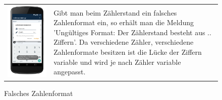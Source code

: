 \begin{figure}[h]
\begin{tabularx}{\textwidth}{X  X}
	\includegraphics[scale = 0.155]{img/AndroidMockup/illegalFormatException} \caption{Falsches Zahlenformat} & Gibt man beim Zählerstand ein falsches Zahlenformat ein, so erhält man die Meldung 'Ungültiges Format: Der Zählerstand besteht aus ..  Ziffern'.  Da verschiedene Zähler, verschiedene Zahlenformate besitzen ist die Lücke der Ziffern variable und wird je nach Zähler variable angepasst.   \\

\end{tabularx}
\end{figure}
